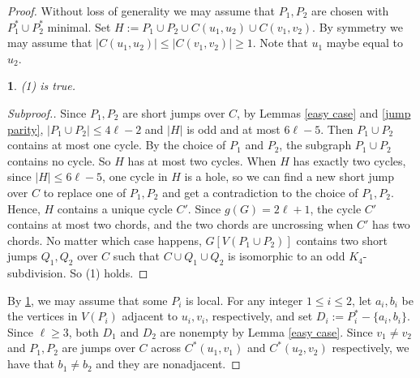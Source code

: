 \documentclass[11pt]{article}
\newtheorem{claim}{}[theorem]
\begin{document}
\begin{proof}
Without loss of generality we may assume that $P_1,P_2$ are chosen with $P_1^*\cup P_2^*$ minimal. Set $H:=P_1\cup P_2\cup C(u_1,u_2)\cup C(v_1,v_2)$. By symmetry we may assume that $|C(u_1,u_2)|\leq |C(v_1,v_2)|\geq1$. Note that $u_1$ maybe equal to $u_2$.

\begin{claim}\label{2short}
(1) is true.
\end{claim}
\begin{proof}[Subproof.]
Since $P_1,P_2$ are short jumps over $C$, by Lemmas \ref{easy case} and \ref{jump parity}, $|P_1\cup P_2|\leq4\ell-2$ and $|H|$ is odd and at most $6\ell-5$. Then $P_1\cup P_2$ contains at most one cycle. By the choice of $P_1$ and $P_2$, the subgraph $P_1\cup P_2$ contains no cycle. So $H$ has at most two cycles. When $H$ has exactly two cycles, since $|H|\leq 6\ell-5$, one cycle in $H$ is a hole, so we can find a new short jump over $C$ to replace one of $P_1,P_2$ and get a contradiction to the choice of $P_1,P_2$. Hence,  $H$ contains a unique cycle $C'$.  Since $g(G)=2\ell+1$, the cycle $C'$ contains at most two chords, and the two chords are uncrossing when $C'$ has two chords. No matter which case happens, $G[V(P_1\cup P_2)]$ contains two short jumps $Q_1,Q_2$ over $C$ such that $C\cup Q_1\cup Q_2$ is isomorphic to an odd  $K_4$-subdivision. So (1) holds.
\end{proof}

By \ref{2short}, we may assume that some $P_i$ is local. For any integer $1\leq i\leq2$, let $a_i, b_i$ be the vertices in $V(P_i)$ adjacent to $u_i,v_i$, respectively, and set $D_i:=P_i^*-\{a_i,b_i\}$. Since $\ell\geq3$, both $D_1$ and $D_2$ are nonempty by Lemma \ref{easy case}. Since $v_1\neq v_2$ and $P_1, P_2$ are jumps over $C$ across $C^*(u_1,v_1)$ and $C^*(u_2,v_2)$ respectively, we have that $b_1\neq b_2$ and they are nonadjacent.


\end{proof}
\end{document}
